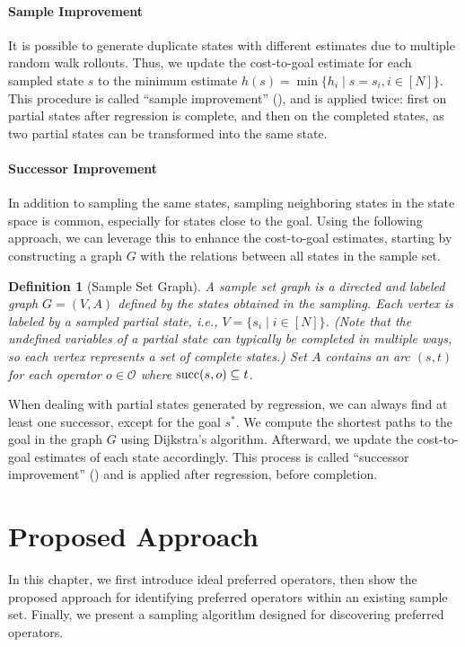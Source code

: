 \documentclass[ppgc,diss,english]{iiufrgs}
\newtheorem{definition}{Definition}
\begin{document}
\subsubsection{Sample Improvement}
\label{sec:sample-sai}
It is possible to generate duplicate states with different estimates due to multiple random walk rollouts. Thus, we update the cost-to-goal estimate for each sampled state $s$ to the minimum estimate $h(s) = \min\{h_i \mid s=s_i, i\in[N]\}$.
This procedure is called ``sample improvement'' (\sai), and is applied twice: first on partial states after regression is complete, and then on the completed states, as two partial states can be transformed into the same state.


\subsubsection{Successor Improvement}
\label{sec:sample-sui}
In addition to sampling the same states, sampling neighboring states in the state space is common, especially for states close to the goal. Using the following approach, we can leverage this to enhance the cost-to-goal estimates, starting by constructing a graph $G$ with the relations between all states in the sample set.

\begin{definition}[Sample Set Graph]\label{def:graph}
A sample set graph is a directed and labeled graph $G=(V,A)$ defined by the states obtained in the sampling. Each vertex is labeled by a sampled partial state, i.e., $V = \{s_i \mid i \in [N]\}$. (Note that the undefined variables of a partial state can typically be completed in multiple ways, so each vertex represents a set of complete states.) Set $A$ contains an arc $(s,t)$ for each operator $o \in \mathcal{O}$ where $\operatorname{succ}(s,o) \subseteq t$.
\end{definition}

When dealing with partial states generated by regression, we can always find at least one successor, except for the goal $s^{*}$. We compute the shortest paths to the goal in the graph $G$ using Dijkstra's algorithm. Afterward, we update the cost-to-goal estimates of each state accordingly. This process is called ``successor improvement'' (\sui) and is applied after regression, before completion.


%
%
\chapter{Proposed Approach}
\label{cha:proposed-approach}
In this chapter, we first introduce ideal preferred operators, then show the proposed approach for identifying preferred operators within an existing sample set. Finally, we present a sampling algorithm designed for discovering preferred operators.
\end{document}
